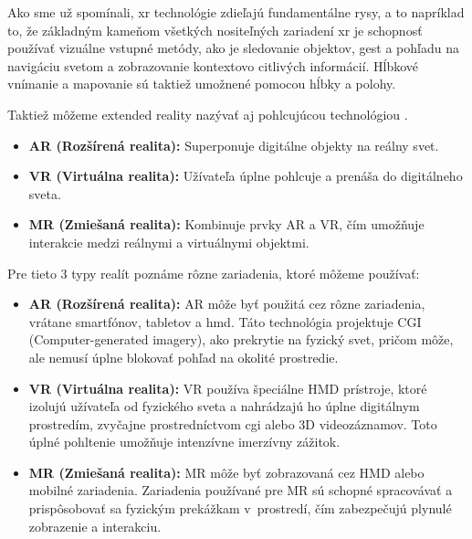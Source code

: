 Ako sme už spomínali, \gls{xr} technológie zdieľajú fundamentálne rysy, a to napríklad to, že základným kameňom všetkých nositeľných zariadení \gls{xr} je schopnosť používať vizuálne vstupné metódy, ako je sledovanie objektov, gest a pohľadu na navigáciu svetom a zobrazovanie kontextovo citlivých informácií. Hĺbkové vnímanie a mapovanie sú taktiež umožnené pomocou hĺbky a polohy. %

Taktiež môžeme extended reality nazývať aj pohlcujúcou technológiou \cite{armXR2022}. 

\begin{itemize}
    \item \textbf{AR (Rozšírená realita):} Superponuje digitálne objekty na reálny svet.
    \item \textbf{VR (Virtuálna realita):} Užívateľa úplne pohlcuje a prenáša do digitálneho sveta.
    \item \textbf{MR (Zmiešaná realita):} Kombinuje prvky AR a VR, čím umožňuje interakcie medzi reálnymi a virtuálnymi objektmi.
\end{itemize}

Pre tieto 3 typy realít poznáme rôzne zariadenia, ktoré môžeme používať:

\begin{itemize}
\item \textbf{AR (Rozšírená realita):} AR môže byť použitá cez rôzne zariadenia, vrátane smartfónov, tabletov a \gls{hmd}. Táto technológia projektuje CGI (Computer-generated imagery), ako prekrytie na fyzický svet, pričom môže, ale nemusí úplne blokovať pohľad na okolité prostredie.
\item \textbf{VR (Virtuálna realita):} VR používa špeciálne HMD prístroje, ktoré izolujú užívateľa od fyzického sveta a nahrádzajú ho úplne digitálnym prostredím, zvyčajne prostredníctvom \gls{cgi} alebo 3D videozáznamov. Toto úplné pohltenie umožňuje intenzívne imerzívny zážitok.
\item \textbf{MR (Zmiešaná realita):} MR môže byť zobrazovaná cez HMD alebo mobilné zariadenia. Zariadenia používané pre MR sú schopné spracovávať a prispôsobovať sa fyzickým prekážkam v~prostredí, čím zabezpečujú plynulé zobrazenie a interakciu.
\end{itemize} %

